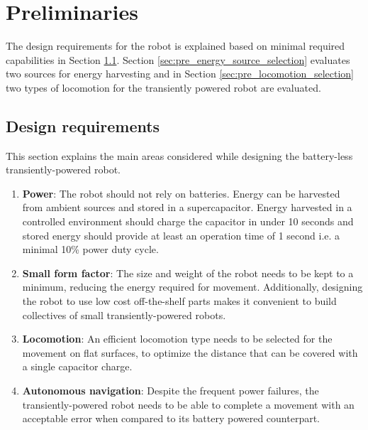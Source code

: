 \chapter{Preliminaries}
\label{chp:preliminaries}

The design requirements for the robot is explained based on minimal required capabilities in Section \ref{sec:pre_design_requirements}.
Section \ref{sec:pre_energy_source_selection} evaluates two sources for energy harvesting and in Section \ref{sec:pre_locomotion_selection} two types of locomotion for the transiently powered robot are evaluated.

\section{Design requirements}
\label{sec:pre_design_requirements}

This section explains the main areas considered while designing the battery-less transiently-powered robot.

\begin{enumerate}
	\item \textbf{Power}: 
	The robot should not rely on batteries.
	Energy can be harvested from ambient sources and stored in a supercapacitor. 
	Energy harvested in a controlled environment should charge the capacitor in under 10 seconds and stored energy should provide at least an operation time of 1 second i.e. a minimal 10\% power duty cycle.
	
	\item \textbf{Small form factor}: 
	The size and weight of the robot needs to be kept to a minimum, reducing the energy required for movement.
	Additionally, designing the robot to use low cost off-the-shelf parts makes it convenient to build collectives of small transiently-powered robots.
	
	\item \textbf{Locomotion}:
	An efficient locomotion type needs to be selected for the movement on flat surfaces, to optimize the distance that can be covered with a single capacitor charge.

	\item \textbf{Autonomous navigation}:
	Despite the frequent power failures, the transiently-powered robot needs to be able to complete a movement with an acceptable error when compared to its battery powered counterpart.
\end{enumerate}

